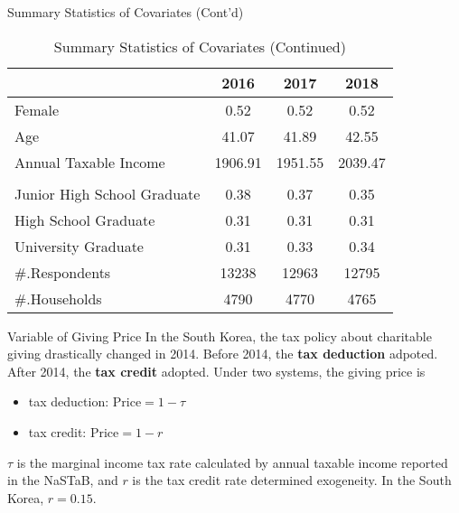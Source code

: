 \documentclass[
  ignorenonframetext,
]{beamer}
\providecommand{\tightlist}{%
  \setlength{\itemsep}{0pt}\setlength{\parskip}{0pt}}
\begin{document}
\begin{frame}{Summary Statistics of Covariates (Cont'd)}
\protect\hypertarget{summary-statistics-of-covariates-contd}{}
\begin{table}

\caption{\label{tab:kableSummaryCovariate2}Summary Statistics of Covariates (Continued)}
\centering
\fontsize{9}{11}\selectfont
\begin{tabular}[t]{lccc}
\toprule
 & 2016 & 2017 & 2018\\
\midrule
Female & 0.52 & 0.52 & 0.52\\
Age & 41.07 & 41.89 & 42.55\\
Annual Taxable Income & 1906.91 & 1951.55 & 2039.47\\
\addlinespace[0.3em]
\multicolumn{4}{l}{\textbf{Education}}\\
\hspace{1em}Junior High School Graduate & 0.38 & 0.37 & 0.35\\
\hspace{1em}High School Graduate & 0.31 & 0.31 & 0.31\\
\hspace{1em}University Graduate & 0.31 & 0.33 & 0.34\\
\#.Respondents & 13238 & 12963 & 12795\\
\#.Households & 4790 & 4770 & 4765\\
\bottomrule
\end{tabular}
\end{table}
\end{frame}

\begin{frame}{Variable of Giving Price}
\protect\hypertarget{variable-of-giving-price}{}
In the South Korea, the tax policy about charitable giving drastically
changed in 2014. Before 2014, the \textbf{tax deduction} adpoted. After
2014, the \textbf{tax credit} adopted. Under two systems, the giving
price is

\begin{itemize}
\tightlist
\item
  tax deduction: \(\text{Price} = 1 - \tau\)
\item
  tax credit: \(\text{Price} = 1 - r\)
\end{itemize}

\(\tau\) is the marginal income tax rate calculated by annual taxable
income reported in the NaSTaB, and \(r\) is the tax credit rate
determined exogeneity. In the South Korea, \(r = 0.15\).
\end{frame}
\end{document}
